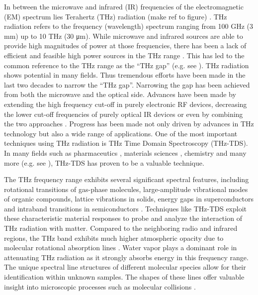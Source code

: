 In between the microwave and infrared (IR) frequencies of the electromagnetic (EM) spectrum lies Terahertz (THz) radiation (make ref to figure) \cite{zhangIntroductionTHzWave2010}. THz radiation refers to the frequency (wavelength) spectrum ranging from \num{100} \si{\giga\hertz} (\num{3} \si{\milli\meter}) up to \num{10} \si{\tera\hertz} (\num{30} \si{\micro\meter}). While microwave and infrared sources are able to provide high magnitudes of power at those frequencies, there has been a lack of efficient and feasible high power sources in the THz range \cite{perkowitzNavigatingTerahertzGap2020}. This has led to the common reference to the THz range as the \enquote{THz gap} (e.g. see \cite{dhillon2017TerahertzScience2017, williamsFillingTHzGap2006, zhangAdvancesTerahertzTechnology2021}). THz radiation shows potential in many fields. Thus tremendous efforts have been made in the last two decades to narrow the \enquote{THz gap}. Narrowing the gap has been achieved from both the microwave and the optical side. Advances have been made by extending the high frequency cut-off in purely electronic RF devices, decreasing the lower cut-off frequencies of purely optical IR devices or even by combining the two approaches \cite{preuTunableContinuouswaveTerahertz2011}. Progress has been made not only driven by advances in THz technology but also a wide range of applications. One of the most important techniques using THz radiation is THz Time Domain Spectroscopy (THz-TDS). In many fields such as pharmaceutics \cite{huangProgressApplicationTerahertz2023}, materials sciences \cite{zhangApplicationTHzTDSCharacterization2024}, chemistry \cite{fischerChemicalRecognitionTerahertz2005} and many more (e.g. see \cite{petrovMobileNearfieldTerahertz2023, markelzPerspectiveTerahertzApplications2022,TerahertzSpectroscopyIts2011,kleine-ostmannReviewTerahertzCommunications2011}), THz-TDS has proven to be a valuable technique.

The THz frequency range exhibits several significant spectral features, including rotational transitions of gas-phase molecules, large-amplitude vibrational modes of organic compounds, lattice vibrations in solids, energy gaps in superconductors and intraband transitions in semiconductors \cite{PrinciplesTerahertzScience2009}. Techniques like THz-TDS exploit these characteristic material responses to probe and analyze the interaction of THz radiation with matter. Compared to the neighboring radio and infrared regions, the THz band exhibits much higher atmospheric opacity due to molecular rotational absorption lines \cite{fedorovPowerfulTerahertzWaves2020}. Water vapor plays a dominant role in attenuating THz radiation as it strongly absorbs energy in this frequency range. The unique spectral line structures of different molecular species allow for their identification within unknown samples. The shapes of these lines offer valuable insight into microscopic processes such as molecular collisions \cite{PrinciplesTerahertzScience2009}.

